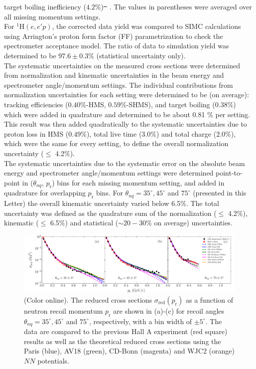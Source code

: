 \documentclass[aps,prl,twocolumn,showpacs,superscriptaddress,groupedaddress]{revtex4-2}  %
\providecommand{\DIFaddtex}[1]{{\protect\color{blue}\uwave{#1}}} %
\providecommand{\DIFdeltex}[1]{{\protect\color{red}\sout{#1}}}                      %
\providecommand{\DIFaddbegin}{} %
\providecommand{\DIFaddend}{} %
\providecommand{\DIFdelbegin}{} %
\providecommand{\DIFdelend}{} %
\providecommand{\DIFadd}[1]{\texorpdfstring{\DIFaddtex{#1}}{#1}} %
\providecommand{\DIFdel}[1]{\texorpdfstring{\DIFdeltex{#1}}{}} %
\newcommand{\DIFscaledelfig}{0.5}
\newlength{\DIFdelgraphicswidth} %
\newlength{\DIFdelgraphicsheight} %
\newcommand{\DIFaddincludegraphics}[2][]{{\color{blue}\fbox{\DIFOincludegraphics[#1]{#2}}}} %
\newcommand{\DIFdelincludegraphics}[2][]{%
\sbox{\DIFdelgraphicsbox}{\DIFOincludegraphics[#1]{#2}}%
\settoboxwidth{\DIFdelgraphicswidth}{\DIFdelgraphicsbox} %
\settoboxtotalheight{\DIFdelgraphicsheight}{\DIFdelgraphicsbox} %
\scalebox{\DIFscaledelfig}{%
\parbox[b]{\DIFdelgraphicswidth}{\usebox{\DIFdelgraphicsbox}\\[-\baselineskip] \rule{\DIFdelgraphicswidth}{0em}}\llap{\resizebox{\DIFdelgraphicswidth}{\DIFdelgraphicsheight}{%
\setlength{\unitlength}{\DIFdelgraphicswidth}%
\begin{picture}(1,1)%
\thicklines\linethickness{2pt} %
{\color[rgb]{1,0,0}\put(0,0){\framebox(1,1){}}}%
{\color[rgb]{1,0,0}\put(0,0){\line( 1,1){1}}}%
{\color[rgb]{1,0,0}\put(0,1){\line(1,-1){1}}}%
\end{picture}%
}\hspace*{3pt}}} %
} %
\DeclareRobustCommand{\DIFaddbegin}{\DIFOaddbegin \let\includegraphics\DIFaddincludegraphics} %
\DeclareRobustCommand{\DIFaddend}{\DIFOaddend \let\includegraphics\DIFOincludegraphics} %
\DeclareRobustCommand{\DIFdelbegin}{\DIFOdelbegin \let\includegraphics\DIFdelincludegraphics} %
\DeclareRobustCommand{\DIFdelend}{\DIFOaddend \let\includegraphics\DIFOincludegraphics} %
\begin{document}
target boiling inefficiency ($4.2 \%$)\DIFdelbegin \DIFdel{\mbox{%
\cite{cyero_phdthesis}}\hspace{0pt}%
}\DIFdelend . The values in parentheses were averaged over all missing momentum settings. \\
\indent For $^{1}\mathrm{H}(e,e'p)$, the corrected data yield was compared to SIMC calculations using Arrington's proton form factor (FF) parametrization \cite{PhysRevC.69.022201} to check the spectrometer acceptance
model. The ratio of data to simulation yield was determined to be $97.6\pm0.3 \%$ (statistical uncertainty only).\\
\indent The systematic uncertainties on the measured cross sections were determined from 
normalization and kinematic uncertainties in the beam energy and spectrometer angle/momentum settings. The individual
contributions from normalization uncertainties for each setting were determined to be (on average)\DIFaddbegin \DIFadd{\mbox{%
\cite{cyero_phdthesis}}\hspace{0pt}%
}\DIFaddend : tracking efficiencies ($0.40 \%$-HMS, $0.59 \%$-SHMS),
and target boiling ($0.38 \%$) which were added in quadrature and determined to be about 0.81 $\%$ per setting. This result was then added quadratically to
the systematic uncertainties due to proton loss in HMS ($0.49 \%$), total live time ($3.0 \%$) and total charge ($2.0\%$), which were the same for every setting,
to define the overall normalization uncertainty ($\leq$ 4.2$\%$).\\
\indent The systematic uncertainties due to the systematic error on the absolute beam energy and spectrometer angle/momentum settings were
determined point-to-point in ($\theta_{nq}$, $p_{\mathrm{r}}$) bins for each missing momentum setting, and added in quadrature for overlapping $p_{\mathrm{r}}$ bins. 
For $\theta_{nq}= 35^{\circ}, 45^{\circ}$ and $75^{\circ}$ (presented in this Letter) the overall kinematic uncertainty varied below 6.5$\%$.
The total uncertainty was defined as the quadrature sum of the normalization ($\leq$ 4.2$\%$), kinematic ($\leq$ 6.5$\%$) and statistical ($\sim20-30\%$ on average) uncertainties.\\
\begin{figure}[t]
\centering        
\includegraphics[scale=0.45]{PRL_plot1.pdf}
\caption{(Color online). The reduced cross sections $\sigma_{\mathrm{red}}(p_{\mathrm{r}})$ as a function of neutron recoil momentum $p_{\mathrm{r}}$ are shown in (a)-(c) for recoil angles $\theta_{nq}=35^{\circ}, 45^{\circ}$ and $75^{\circ}$, respectively,
with a bin width of $\pm 5^{\circ}$. The data are compared to the previous Hall A experiment (red square) results \cite{PhysRevLett.107.262501} as well as the theoretical reduced cross sections using the Paris (blue),
AV18 (green), CD-Bonn (magenta) and WJC2 (orange) $NN$ potentials.}
\label{fig:fig1}
\end{figure}
\end{document}
